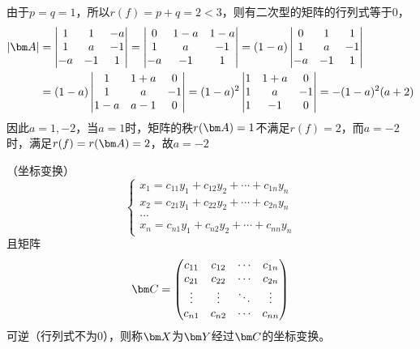 \begin{solution}
    由于$p=q=1$，所以$r(f) = p+q = 2 < 3$，则有二次型的矩阵的行列式等于$0$，
    \begin{align*}
        |\mat{A}| & =
        \begin{vmatrix}
            1  & 1  & -a \\
            1  & a  & -1 \\
            -a & -1 & 1
        \end{vmatrix}
        =
        \begin{vmatrix}
            0  & 1-a & 1-a \\
            1  & a   & -1  \\
            -a & -1  & 1
        \end{vmatrix}
        =(1-a)
        \begin{vmatrix}
            0  & 1  & 1  \\
            1  & a  & -1 \\
            -a & -1 & 1
        \end{vmatrix}
        \\
                  & =(1-a)
        \begin{vmatrix}
            1   & 1+a & 0  \\
            1   & a   & -1 \\
            1-a & a-1 & 0
        \end{vmatrix}
        =(1-a)^2
        \begin{vmatrix}
            1 & 1+a & 0  \\
            1 & a   & -1 \\
            1 & -1  & 0
        \end{vmatrix}
        =-(1-a)^2(a+2)
    \end{align*}
    因此$a=1,-2$，当$a=1$时，矩阵的秩$r(\mat{A})=1$不满足$r(f)=2$，而$a=-2$时，满足$r(f)=r(\mat{A})=2$，故$a=-2$

\end{solution}

\begin{definition}
    （坐标变换）
    \[
        \begin{cases}
            x_1 = c_{11}y_1 + c_{12}y_2 + \cdots + c_{1n}y_n \\
            x_2 = c_{21}y_1 + c_{22}y_2 + \cdots + c_{2n}y_n \\
            ...                                              \\
            x_n = c_{n1}y_1 + c_{n2}y_2 + \cdots + c_{nn}y_n
        \end{cases}
    \]
    且矩阵
    \[
        \mat{C} =
        \begin{pmatrix}
            c_{11} & c_{12} & \cdots & c_{1n} \\
            c_{21} & c_{22} & \cdots & c_{2n} \\
            \vdots & \vdots & \ddots & \vdots \\
            c_{n1} & c_{n2} & \cdots & c_{nn}
        \end{pmatrix}
    \]
    可逆（行列式不为$0$），则称$\mat{X}$为$\mat{Y}$经过$\mat{C}$的坐标变换。
\end{definition}

